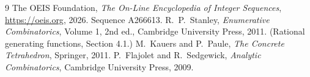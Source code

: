 \documentclass[11pt,a4paper]{article}
\theoremstyle{plain}
\theoremstyle{definition}
\begin{document}
\begin{thebibliography}{9}
 The OEIS Foundation, \emph{The On-Line Encyclopedia of Integer
Sequences}, \url{https://oeis.org}, 2026. Sequence A266613.
 R.~P.~Stanley, \emph{Enumerative Combinatorics}, Volume 1, 2nd ed.,
Cambridge University Press, 2011. (Rational generating functions, Section 4.1.)
 M.~Kauers and P.~Paule, \emph{The Concrete Tetrahedron}, Springer, 2011.
 P.~Flajolet and R.~Sedgewick, \emph{Analytic Combinatorics}, Cambridge
University Press, 2009.
\end{thebibliography}
\end{document}
